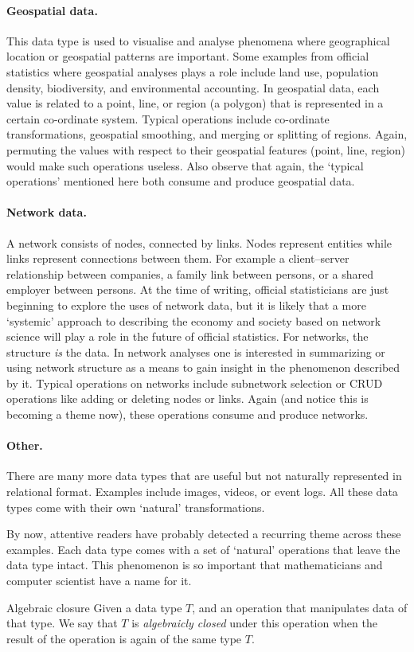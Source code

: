\paragraph{Geospatial data.} This data type is used to visualise and analyse
phenomena where geographical location or geospatial patterns are important.
Some examples from official statistics where geospatial analyses plays a role
include land use, population density, biodiversity, and environmental
accounting. In geospatial data, each value is related to a point, line, or
region (a polygon) that is represented in a certain co-ordinate system.
Typical operations include co-ordinate transformations, geospatial smoothing,
and merging or splitting of regions. Again, permuting the values with respect
to their geospatial features (point, line, region) would make such operations
useless. Also observe that again, the `typical operations' mentioned here both
consume and produce geospatial data.


\paragraph{Network data.} A network consists of nodes, connected by links.
Nodes represent entities while links represent connections between them.  For
example a client--server relationship between companies, a family link between
persons, or a shared employer between persons.  At the time of writing,
official statisticians are just beginning to explore the uses of network data,
but it is likely that a more `systemic' approach to describing the economy and
society based on network science will play a role in the future of official
statistics. For networks, the structure \emph{is} the data. In network analyses
one is interested in summarizing or using network structure as a means to gain
insight in the phenomenon described by it. Typical operations on networks
include subnetwork selection or CRUD operations like adding or deleting nodes
or links. Again (and notice this is becoming a theme now), these operations
consume and produce networks.


\paragraph{Other.} There are many more data types that are useful but not
naturally represented in relational format. Examples include images, videos, or
event logs. All these data types come with their own `natural' transformations.

By now, attentive readers have probably detected a recurring theme across
these examples. Each data type comes with a set of `natural' operations that
leave the data type intact. This phenomenon is so important that mathematicians
and computer scientist have a name for it.
\begin{terminology}{Algebraic closure} Given
a data type $T$, and an operation that manipulates data of that type.  We say
that $T$ is \emph{algebraicly closed} under this operation when the result of
the operation is again of the same type $T$.
\end{terminology}

